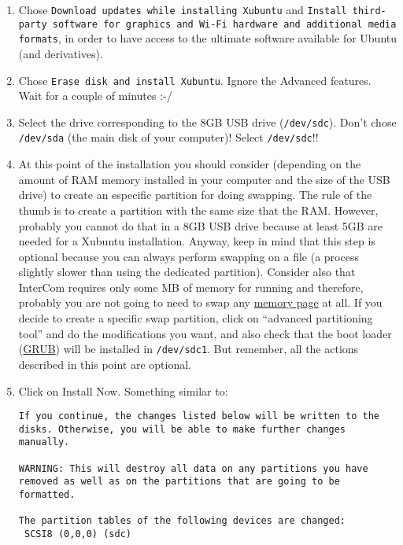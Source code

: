\begin{enumerate}
\item Chose \texttt{Download updates while installing Xubuntu} and
  \texttt{Install third-party software for graphics and Wi-Fi hardware
    and additional media formats}, in order to have access to the
    ultimate software available for Ubuntu (and derivatives).

\item Chose \texttt{Erase disk and install Xubuntu}. Ignore the
  Advanced features. Wait for a couple of minutes :-/

\item Select the drive corresponding to the 8GB USB drive
  (\texttt{/dev/sdc}). Don't chose \texttt{/dev/sda} (the main disk of
  your computer)! Select \texttt{/dev/sdc}!!

\item At this point of the installation you should consider (depending
  on the amount of RAM memory installed in your computer and the size
  of the USB drive) to create an especific partition for doing
  swapping. The rule of the thumb is to create a partition with the
  same size that the RAM. However, probably you cannot do that in a
  8GB USB drive because at least 5GB are needed for a Xubuntu
  installation. Anyway, keep in mind that this step is optional
  because you can always perform swapping on a file (a process
  slightly slower than using the dedicated partition). Consider also
  that InterCom requires only some MB of memory for running and
  therefore, probably you are not going to need to swap any
  \href{https://en.wikipedia.org/wiki/Page_(computer_memory)}{memory
    page} at all. If you decide to create a specific swap partition,
  click on ``advanced partitioning tool'' and do the modifications you
  want, and also check that the boot loader
  (\href{https://www.gnu.org/software/grub/}{GRUB}) will be installed
  in \texttt{/dev/sdc1}. But remember, all the actions described in
  this point are optional.

\item Click on Install Now. Something similar to:

\begin{verbatim}
If you continue, the changes listed below will be written to the disks. Otherwise, you will be able to make further changes manually.

WARNING: This will destroy all data on any partitions you have removed as well as on the partitions that are going to be formatted.

The partition tables of the following devices are changed:
 SCSI8 (0,0,0) (sdc)


\end{verbatim}
\end{enumerate}
